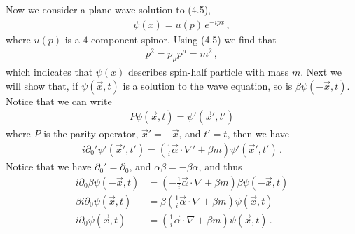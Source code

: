 \documentclass[11pt, onesided]{book}
\theoremstyle{break}
\theoremstyle{break}
\newcommand{\pd}{\partial}
\begin{document}
Now we consider a plane wave solution to (4.5),
\begin{align*}
\psi(x) =u(p)\, e^{-ipx}\,,
\end{align*}
where $u(p)$ is a $4$-component spinor. Using (4.5) we find that
\begin{align*}
p^2 = p_\mu p^\mu = m^2\,,
\end{align*}
which indicates that $\psi(x)$ describes spin-half particle with mass $m$. Next we will show that, if $\psi(\vec{x},t)$ is a solution to the wave equation, so is $\beta \psi(-\vec{x},t)$. Notice that we can write
\begin{align*}
P\psi(\vec{x},t) = \psi'(\vec{x}', t')
\end{align*} 
where $P$ is the parity operator, $\vec{x}' =- \vec{x}$, and $t' = t$, then we have
\begin{align*}
i\pd_0'\psi'(\vec{x}', t') = \left( \frac{1}{i}\vec{\alpha}\cdot \nabla' + \beta m\right) \psi'(\vec{x}', t')\,.
\end{align*}
Notice that we have $\pd_0' = \pd_0$, and $\alpha\beta = -\beta \alpha$, and thus
\begin{align*}
i\pd_0 \beta\psi(-\vec{x}, t) &= \left(-\frac{1}{i}\vec{\alpha}\cdot \nabla + \beta m\right) \beta\psi(-\vec{x}, t)\\
\beta i\pd_0 \psi(\vec{x}, t) &= \beta\left(\frac{1}{i}\vec{\alpha}\cdot \nabla + \beta m\right) \psi(\vec{x}, t)\\
 i\pd_0 \psi(\vec{x}, t) &= \left(\frac{1}{i}\vec{\alpha}\cdot \nabla + \beta m\right) \psi(\vec{x}, t)\,.
\end{align*}
\end{document}
